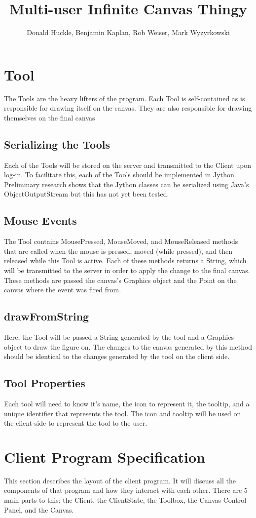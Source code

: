 \documentclass[12pt]{article}
\title{Multi-user Infinite Canvas Thingy}
\author{Donald Huckle, Benjamin Kaplan, Rob Weiser, Mark Wyzyrkowski}
\begin{document}
 \maketitle
 \section{Tool}
 The Tools are the heavy lifters of the program. Each Tool is self-contained as
 is responsible for drawing itself on the canvas. They are also responsible for
 drawing themselves on the final canvas
 \subsection{Serializing the Tools}
 Each of the Tools will be stored on the server and transmitted to the Client
 upon log-in. To facilitate this, each of the Tools should be implemented in
 Jython. Preliminary research shows that the Jython classes can be serialized using Java's
 ObjectOutputStream but this has not yet been tested.
 \subsection{Mouse Events}
 The Tool contains MousePressed, MouseMoved, and MouseReleased methods that are
 called when the mouse is pressed, moved (while pressed), and then released
 while this Tool is active. Each of these methods returns a String, which will
 be transmitted to the server in order to apply the change to the final canvas.
 These methods are passed the canvas's Graphics object and the Point on the
 canvas where the event was fired from.

 \subsection{drawFromString}
Here, the Tool will be passed a String generated by the tool and a Graphics
object to draw the figure on. The changes to the canvas generated by this method should be
identical to the changes generated by the tool on the client side.
\subsection{Tool Properties}
Each tool will need to know it's name, the icon to represent it, the tooltip,
and a unique identifier that represents the tool. The icon and tooltip will be
used on the client-side to represent the tool to the user.

\section{Client Program Specification}
 This section describes the layout of the client program. It will discuss all
 the components of that program and how they interact with each other. There
 are 5 main parts to this: the Client, the ClientState, the Toolbox, the
 Canvas Control Panel, and the Canvas.
\end{document}
